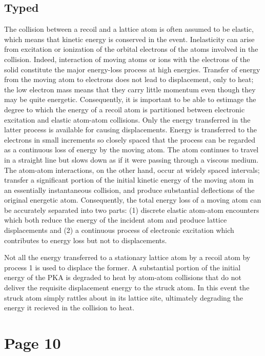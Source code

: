 \documentclass[11pt]{article}
\begin{document}
\subsection{Typed}
The collision between a recoil and a lattice atom is often assumed to be elastic, which means that kinetic energy is conserved in the event. Inelasticity can arise from excitation or ionization of the orbital electrons of the atoms involved in the collision. Indeed, interaction of moving atoms or ions with the electrons of the solid constitute the major energy-loss process at high energies. Transfer of energy from the moving atom to electrons does not lead to displacement, only to heat; the low electron mass means that they carry little momentum even though they may be quite energetic. Consequently, it is important to be able to estimage the degree to which the energy of a recoil atom is partitioned between electronic excitation and elastic atom-atom collisions. Only the energy transferred in the latter process is available for causing displacements. Energy is transferred to the electrons in small increments so closely spaced that the process can be regarded as a continuous loss of energy by the moving atom. The atom continues to travel in a straight line but slows down as if it were passing through a viscous medium. The atom-atom interactions, on the other hand, occur at widely spaced intervals; transfer a significant portion of the initial kinetic energy of the moving atom in an essentially instantaneous collision, and produce substantial deflections of the original energetic atom. Consequently, the total energy loss of a moving atom can be accurately separated into two parts: (1) discrete elastic atom-atom encounters which both reduce the energy of the incident atom and produce lattice displacements and (2) a continuous process of electronic excitation which contributes to energy loss but not to displacements.

Not all the energy transferred to a stationary lattice atom by a recoil atom by process 1 is used to displace the former. A substantial portion of the initial energy of the PKA is degraded to heat by atom-atom collisions that do not deliver the requisite displacement energy to the struck atom. In this event the struck atom simply rattles about in its lattice site, ultimately degrading the energy it recieved in the collision to heat.

\section{Page 10}
\end{document}
